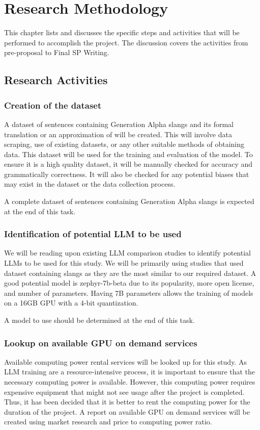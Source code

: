 \chapter{Research Methodology}
This chapter lists and discusses the specific steps and activities that will be performed  to accomplish the project. 
The discussion covers the activities from pre-proposal to Final SP Writing.

\section{Research Activities}
\subsection{Creation of the dataset} 
A dataset of sentences containing Generation Alpha slangs and its formal translation or an approximation of will be created.
This will involve data scraping, use of existing datasets, or any other suitable methods of obtaining data.
This dataset will be used for the training and evaluation of the model.
To ensure it is a high quality dataset, it will be manually checked for accuracy and grammatically correctness.
It will also be checked for any potential biases that may exist in the dataset or the data collection process.

A complete dataset of sentences containing Generation Alpha slangs is expected at the end of this task. 

\subsection{Identification of potential LLM to be used}
We will be reading upon existing LLM comparison studies to identify potential LLMs to be used for this study.
We will be primarily using studies that used dataset containing slangs as they are the most similar to our required dataset.
A good potential model is zephyr-7b-beta due to its popularity, more open license, and number of parameters.
Having 7B parameters allows the training of models on a 16GB GPU with a 4-bit quantization.

A model to use should be determined at the end of this task.

\subsection{Lookup on available GPU on demand services} 
Available computing power rental services will be looked up for this study.
As LLM training are a resource-intensive process, it is important to ensure that the necessary computing power is available.
However, this computing power requires expensive equipment that might not see usage after the project is completed.
Thus, it has been decided that it is better to rent the computing power for the duration of the project.
A report on available GPU on demand services will be created using market research and price to computing power ratio.


